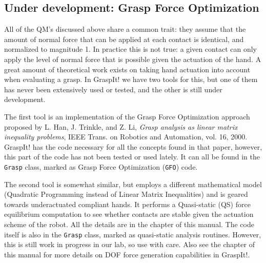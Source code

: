 \subsection{Under development: Grasp Force Optimization}

All of the QM's discussed above share a common trait: they assume that
the amount of normal force that can be applied at each contact is
identical, and normalized to magnitude 1. In practice this is not
true: a given contact can only apply the level of normal force that is
possible given the actuation of the hand. A great amount of
theoretical work exists on taking hand actuation into account when
evaluating a grasp. In GraspIt! we have two tools for this, but one of
them has never been extensively used or tested, and the other is still
under development.

The first tool is an implementation of the Grasp Force Optimization
approach proposed by L. Han, J. Trinkle, and Z. Li, \textit{Grasp
  analysis as linear matrix inequality problems}, IEEE Trans. on
Robotics and Automation, vol. 16, 2000. GraspIt! has the code
necessary for all the concepts found in that paper, however, this part
of the code has not been tested or used lately. It can all be found in
the \texttt{Grasp} class, marked as Grasp Force Optimization
(\texttt{GFO}) code.

The second tool is somewhat similar, but employs a different
mathematical model (Quadratic Programming instead of Linear Matrix
Inequalities) and is geared towards underactuated compliant hands. It
performs a Quasi-static (QS) force equilibrium computation to see
whether contacts are stable given the actuation scheme of the
robot. All the details are in the
 chapter of this manual. The code
itself is also in the \texttt{Grasp} class, marked as quasi-static
analysis routines. However, this is still work in progress in our lab,
so use with care. Also see the 
chapter of this manual for more details on DOF force generation
capabilities in GraspIt!.
